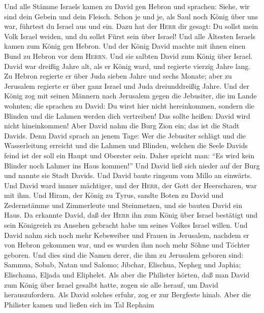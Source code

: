  Und alle Stämme Israels kamen zu David gen Hebron und
sprachen: Siehe, wir sind dein Gebein und dein Fleisch. 
Schon je und je, als Saul noch König über uns war, führtest du Israel
aus und ein. Dazu hat der \textsc{Herr} dir gesagt: Du sollst mein Volk
Israel weiden, und du sollst Fürst sein über Israel!  Und
alle Ältesten Israels kamen zum König gen Hebron. Und der König David
machte mit ihnen einen Bund zu Hebron vor dem \textsc{Herrn}. Und sie
salbten David zum König über Israel.  David war dreißig
Jahre alt, als er König ward, und regierte vierzig Jahre lang.
 Zu Hebron regierte er über Juda sieben Jahre und sechs
Monate; aber zu Jerusalem regierte er über ganz Israel und Juda
dreiunddreißig Jahre.  Und der König zog mit seinen
Männern nach Jerusalem gegen die Jebusiter, die im Lande wohnten; die
sprachen zu David: Du wirst hier nicht hereinkommen, sondern die Blinden
und die Lahmen werden dich vertreiben! Das sollte heißen: David wird
nicht hineinkommen!  Aber David nahm die Burg Zion ein;
das ist die Stadt Davids.  Denn David sprach an jenem
Tage: Wer die Jebusiter schlägt und die Wasserleitung erreicht und die
Lahmen und Blinden, welchen die Seele Davids feind ist der soll ein
Haupt und Oberster sein. Daher spricht man: ``Es wird kein Blinder noch
Lahmer ins Haus kommen!''  Und David ließ sich nieder auf
der Burg und nannte sie Stadt Davids. Und David baute ringsum vom Millo
an einwärts.  Und David ward immer mächtiger, und der
\textsc{Herr}, der Gott der Heerscharen, war mit ihm. 
Und Hiram, der König zu Tyrus, sandte Boten zu David und Zedernstämme
und Zimmerleute und Steinmetzen, und sie bauten David ein Haus.
 Da erkannte David, daß der \textsc{Herr} ihn zum König
über Israel bestätigt und sein Königreich zu Ansehen gebracht habe um
seines Volkes Israel willen.  Und David nahm sich noch
mehr Kebsweiber und Frauen in Jerusalem, nachdem er von Hebron gekommen
war, und es wurden ihm noch mehr Söhne und Töchter geboren.
 Und dies sind die Namen derer, die ihm zu Jerusalem
geboren sind: Sammua, Sobab, Natan und Salomo;  Jibchar,
Elischua, Nepheg und Japhia;  Elischama, Eljada und
Eliphelet.  Als aber die Philister hörten, daß man David
zum König über Israel gesalbt hatte, zogen sie alle herauf, um David
herauszufordern. Als David solches erfuhr, zog er zur Bergfeste hinab.
 Aber die Philister kamen und ließen sich im Tal Rephaim
